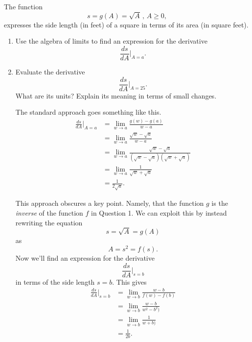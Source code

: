 \documentclass{ximera}
\begin{document}
\begin{question} \label{QDfg5rtghbcvdf}
The function 
\[
   s = g(A) =\sqrt{A} \, , \, A\geq 0 ,
\]
expresses the side length (in feet) of a square in terms of its area (in square feet).

\begin{enumerate}

\item Use the algebra of limits to find an expression for the derivative
\[
      \frac{ds}{dA}\Big|_{A=a}.
\]

\item Evaluate the derivative
\[
     \frac{ds}{dA}\Big|_{A=25}.
\]
What are its units? Explain its meaning in terms of small changes.

\begin{explanation}
The standard approach goes something like this.
\begin{align*}
    \frac{ds}{dA}\Big|_{A=a} &= \lim_{w\to a} \frac{g(w)-g(a)}{w-a} \\
                                             &= \lim_{w\to a} \frac{\sqrt{w}-\sqrt{a}}{w-a} \\
                                            &= \lim_{w\to a} \frac{\sqrt{w}-\sqrt{a}}{(\sqrt{w}-\sqrt{a})(\sqrt{w}+\sqrt{a})} \\
                                           &= \lim_{w\to a} \frac{1}{\sqrt{w}+\sqrt{a}} \\
                                            &= \frac{1}{2\sqrt{a}} .
\end{align*}

This approach obscures a key point. Namely, that the function $g$ is the \emph{inverse} of the function $f$ in Question 1. We can exploit this by instead rewriting the equation
\[
       s = \sqrt{A} = g(A)
\]
as 
\[
    A = s^2 = f(s).
\]
Now we'll find an expression for the derivative
\[
     \frac{ds}{dA}\Big|_{s=b}
\]
in terms of the side length $s=b$. This gives
\begin{align*}
        \frac{ds}{dA}\Big|_{s=b} &= \lim_{w\to b}\frac{w-b}{f(w) - f(b)} \\
                                              &=\lim_{w\to b}\frac{w-b}{w^2 - b^2)}\\
                                              &=\lim_{w\to b}\frac{1}{w+b)} \\
                                               &= \frac{1}{2b} .
\end{align*}


\end{explanation}
\end{enumerate}
\end{question}
\end{document}
